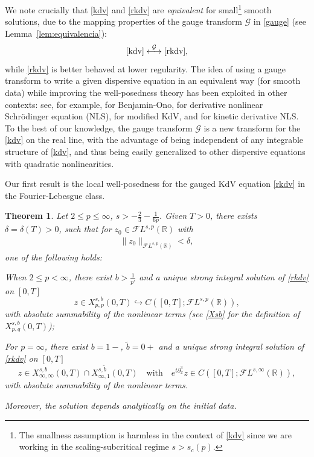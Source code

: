 \documentclass[a4paper,
11pt,  reqno]{amsart}
\newcommand{\5}{\textup{V}}
\newcommand{\noi}{\noindent}
\newcommand{\FL}{\mathcal{F} L}
\newcommand{\dl}{\delta}
\newtheorem{theorem}{Theorem} [section]
\theoremstyle{remark}
\newcommand{\R}{\mathbb{R}}
\newcommand{\Gc}{\mathcal{G}}
\numberwithin{equation}{section}
\numberwithin{theorem}{section}
\begin{document}
\medskip 
    
    We note crucially that \eqref{kdv} and \eqref{rkdv} are \textit{equivalent} for small\footnote{The smallness assumption is harmless in the context of \eqref{kdv} since we are working in the scaling-subcritical regime $s>s_c(p)$.} smooth solutions, due to the mapping properties of the gauge transform $\Gc$ in \eqref{gauge} (see Lemma~\ref{lem:equivalencia}):
    $$
\eqref{kdv} \overset{\Gc}{\longleftrightarrow} \eqref{rkdv}, 
    $$
while \eqref{rkdv} is better behaved at lower regularity. 
The idea of using a gauge transform to write a given dispersive equation in an equivalent way (for smooth data) while improving the well-posedness theory has been exploited in other contexts: see, for example,   \cite{IfrimTataru, MolinetPilod_bo, tao_bo} for Benjamin-Ono, \cite{CKSTT_dnls, Herr_dnls, takaoka_dnls} for derivative nonlinear Schr\"odinger equation (NLS), \cite{Chapouto_FL_mkdv} for modified KdV, and \cite{KishimotoTsutsumi_kdnls} for kinetic derivative NLS.
To the best of our knowledge, the gauge transform $\Gc$ is a new transform for the \eqref{kdv} on the real line, with the advantage of being independent of 
any integrable structure of \eqref{kdv}, and thus being easily generalized to other dispersive equations with quadratic nonlinearities.

\medskip

 Our first result is the local well-posedness for the gauged KdV equation \eqref{rkdv} in the Fourier-Lebesgue class.
    
	\begin{theorem}\label{thm:lwp_rkdv}
Let $2 \le p \le \infty$, $s> - \frac23 - \frac{1}{6p}$. Given $T>0$, there exists $\dl = \dl(T)>0$, such that for $z_0 \in \FL^{s, p}(\R)$ with
\begin{align}
    \|z_0\|_{\FL^{s,p}(\R)} < \dl, 
\end{align}
one of the following holds:

\vspace{1mm}

\noi{\rm(i)}
When $ 2 \le p <\infty$, 
there exist $b>\frac{1}{p'}$ and  a unique strong integral solution of \eqref{rkdv} on $[0,T]$
	$$z\in X^{s,b}_{p, p}(0,T)\hookrightarrow C([0,T]; \mathcal{F}L^{s,p}(\R)),$$ 
    with absolute summability of the nonlinear terms (see \eqref{Xsb} for the definition of $X^{s,b}_{p,q}(0,T)$);

\vspace{1mm}

\smallskip
\noi{\rm(ii)}
For $p=\infty$, there exist $b=1-$, $\tilde{b}=0+$ and a unique strong integral solution of \eqref{rkdv} on $[0,T]$
	$$z\in X^{s,b}_{\infty,\infty}(0,T)\cap X^{s,\tilde{b}}_{\infty,1}(0,T)
    \quad 
    \text{with}
    \quad 
    e^{t\partial_x^3}z \in C([0,T]; \mathcal{F}L^{s,\infty}(\R))
    ,
    $$ 
    with absolute summability of the nonlinear terms.

\smallskip 
\noi
    Moreover, the solution depends analytically on the initial data.
\end{theorem}
\end{document}
